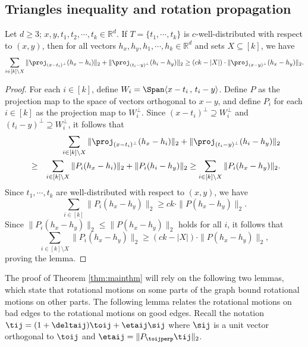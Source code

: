 \subsection{Triangles inequality and rotation propagation} \label{sec-triangles-inequality}

\begin{lemma} \label{lem:triangles}
Let $d\ge3$; $x,y,t_{1},t_{2},\cdots,t_{k}\in\mathbb{R}^{d}$.
If $T=\{t_{1},\cdots,t_{k}\}$ is $c$-well-distributed
with respect to $(x,y)$, then for all vectors $h_{x},h_{y},h_{1},\cdots,h_{k}\in\mathbb{R}^{d}$
and sets $X\subseteq[k]$, we have
\[
\sum_{i\in[k]\setminus X}\|\proj_{(x-t_{i})^{\perp}}(h_{x}-h_{i})\|_2 +\|\proj_{(t_{i}-y)^{\perp}}(h_{i}-h_{y})\|_2 \ge(ck-|X|)\cdot\|\proj_{(x-y)^{\perp}}(h_{x}-h_{y})\|_2.
\]
\end{lemma}
\begin{proof}
For each $i\in[k]$, define $W_{i}=\Span\langle x-t_{i}\,,\, t_{i}-y\rangle$.
Define $P$ as the projection map to the space of vectors orthogonal
to $x-y$, and define $P_{i}$ for each $i\in[k]$  as the projection
map to $W_{i}^{\perp}$. Since $(x-t_{i})^{\perp}\supseteq W_{i}^{\perp}$
and $(t_{i}-y)^{\perp}\supseteq W_{i}^{\perp}$, it follows that 
\begin{eqnarray*}
 &  & \sum_{i\in[k]\setminus X}\|\proj_{(x-t_{i})^{\perp}}(h_{x}-h_{i})\|_2 +\|\proj_{(t_{i}-y)^{\perp}}(h_{i}-h_{y})\|_2\\
 & \ge & \sum_{i\in[k]\setminus X}\|P_{i}(h_{x}-h_{i})\|_2 +\|P_{i}(h_{i}-h_{y})\|_2 \ge\sum_{i\in[k]\setminus X}\|P_{i}(h_{x}-h_{y})\|_2.
\end{eqnarray*}
Since $t_{1},\cdots,t_{k}$ are well-distributed with respect to $(x,y)$,
we have
\begin{equation}
\sum_{i\in[k]}\|P_{i}(h_{x}-h_{y})\|_2 \ge ck\cdot\|P(h_{x}-h_{y})\|_2.\label{eq:proj_triangles}
\end{equation}
Since $\|P_{i}(h_{x}-h_{y})\|_2\le\|P(h_{x}-h_{y})\|_2$ holds for all
$i$, it follows that 
\[
\sum_{i\in[k]\setminus X}\|P_{i}(h_{x}-h_{y})\|_2 \ge(ck-|X|)\cdot\|P(h_{x}-h_{y})\|_2,
\]
proving the lemma.
\end{proof}

The proof of Theorem \ref{thm:mainthm} will rely on the following two lemmas, which state that rotational motions on some parts of the graph bound rotational motions on other parts. The following lemma relates the rotational motions on bad edges to the rotational motions on good edges.  Recall the notation $\tij = (1 + \deltaij) \toij + \etaij \sij$ where $\sij$ is a unit vector orthogonal to $\toij$ and $\etaij = \| P_{\toijperp} \tij \|_2$.



